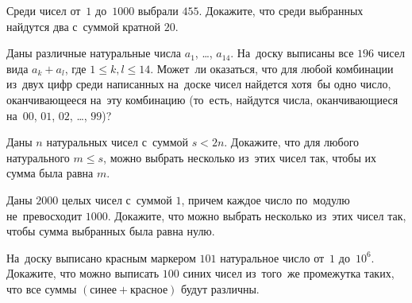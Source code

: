 



\begin{problems}

\item
Среди чисел от~$1$ до~$1000$ выбрали $455$.
Докажите, что среди выбранных найдутся два с~суммой кратной $20$.

\item
Даны различные натуральные числа $a_{1}$, \ldots, $a_{14}$.
На~доску выписаны все $196$ чисел вида $a_{k} + a_{l}$, где
$1 \leq k, l \leq 14$.
Может~ли оказаться, что для любой комбинации из~двух цифр среди написанных
на~доске чисел найдется хотя~бы одно число, оканчивающееся на~эту комбинацию
(то~есть, найдутся числа, оканчивающиеся на~$00$, $01$, $02$, \ldots, $99$)?

\item
Даны $n$ натуральных чисел с~суммой $s < 2 n$.
Докажите, что для любого натурального $m \leq s$, можно выбрать несколько
из~этих чисел так, чтобы их сумма была равна $m$.

\item
Даны $2000$ целых чисел с~суммой $1$, причем каждое число по~модулю
не~превосходит $1000$.
Докажите, что можно выбрать несколько из~этих чисел так, чтобы сумма выбранных
была равна нулю.

\item
На~доску выписано красным маркером $101$ натуральное число от~$1$ до~$10^{6}$.
Докажите, что можно выписать $100$ синих чисел из~того~же промежутка таких, что
все суммы $(\text{синее} + \text{красное})$ будут различны.

\end{problems}

